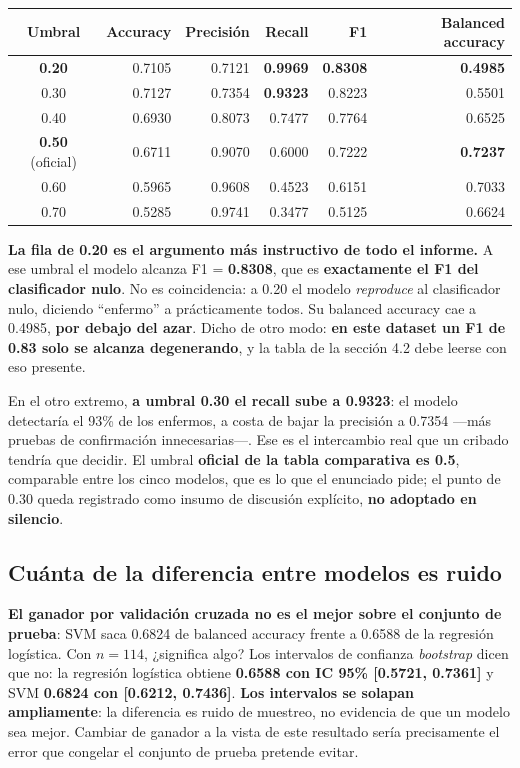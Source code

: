 \documentclass[10pt,a4paper]{article}
\begin{document}
\begin{table}[H]
\footnotesize
\centering
\begin{tabular}{@{}c r r r r r@{}}
\toprule
\textbf{Umbral} & \textbf{Accuracy} & \textbf{Precisión} & \textbf{Recall} & \textbf{F1} & \textbf{Balanced accuracy} \\
\midrule
\textbf{0.20} & 0.7105 & 0.7121 & \textbf{0.9969} & \textbf{0.8308} & \textbf{0.4985} \\
0.30 & 0.7127 & 0.7354 & \textbf{0.9323} & 0.8223 & 0.5501 \\
0.40 & 0.6930 & 0.8073 & 0.7477 & 0.7764 & 0.6525 \\
\textbf{0.50} (oficial) & 0.6711 & 0.9070 & 0.6000 & 0.7222 & \textbf{0.7237} \\
0.60 & 0.5965 & 0.9608 & 0.4523 & 0.6151 & 0.7033 \\
0.70 & 0.5285 & 0.9741 & 0.3477 & 0.5125 & 0.6624 \\
\bottomrule
\end{tabular}
\end{table}

\textbf{La fila de 0.20 es el argumento más instructivo de todo el informe.} A ese umbral el modelo alcanza F1 = \textbf{0.8308}, que es \textbf{exactamente el F1 del clasificador nulo}. No es coincidencia: a 0.20 el modelo \textit{reproduce} al clasificador nulo, diciendo ``enfermo'' a prácticamente todos. Su balanced accuracy cae a 0.4985, \textbf{por debajo del azar}. Dicho de otro modo: \textbf{en este dataset un F1 de 0.83 solo se alcanza degenerando}, y la tabla de la sección 4.2 debe leerse con eso presente.

En el otro extremo, \textbf{a umbral 0.30 el recall sube a 0.9323}: el modelo detectaría el 93\% de los enfermos, a costa de bajar la precisión a 0.7354 ---más pruebas de confirmación innecesarias---. Ese es el intercambio real que un cribado tendría que decidir. El umbral \textbf{oficial de la tabla comparativa es 0.5}, comparable entre los cinco modelos, que es lo que el enunciado pide; el punto de 0.30 queda registrado como insumo de discusión explícito, \textbf{no adoptado en silencio}.

\subsection{Cuánta de la diferencia entre modelos es ruido}

\textbf{El ganador por validación cruzada no es el mejor sobre el conjunto de prueba}: SVM saca 0.6824 de balanced accuracy frente a 0.6588 de la regresión logística. Con $n=114$, ¿significa algo? Los intervalos de confianza \textit{bootstrap} dicen que no: la regresión logística obtiene \textbf{0.6588 con IC 95\% [0.5721, 0.7361]} y SVM \textbf{0.6824 con [0.6212, 0.7436]}. \textbf{Los intervalos se solapan ampliamente}: la diferencia es ruido de muestreo, no evidencia de que un modelo sea mejor. Cambiar de ganador a la vista de este resultado sería precisamente el error que congelar el conjunto de prueba pretende evitar.
\end{document}
